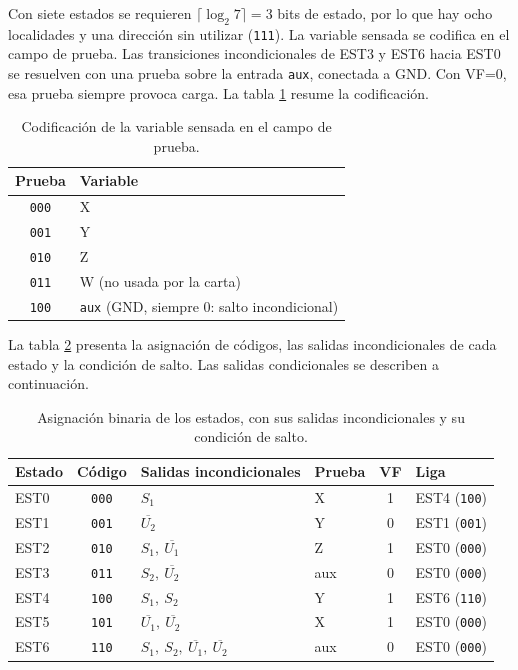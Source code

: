 Con siete estados se requieren $\lceil \log_2 7 \rceil = 3$ bits de estado, por lo que hay ocho
localidades y una dirección sin utilizar (\texttt{111}). La variable sensada se codifica en el
campo de prueba. Las transiciones incondicionales de EST3 y EST6 hacia EST0 se resuelven con una
prueba sobre la entrada \texttt{aux}, conectada a GND. Con VF=0, esa prueba siempre provoca carga.
La tabla \ref{tab:entradas} resume la codificación.

\begin{table}[H]
  \centering
  \caption{Codificación de la variable sensada en el campo de prueba.}
  \label{tab:entradas}
  \begin{tabular}{@{}c l@{}}
    \toprule
    \textbf{Prueba} & \textbf{Variable} \\
    \midrule
    \texttt{000} & X \\
    \texttt{001} & Y \\
    \texttt{010} & Z \\
    \texttt{011} & W (no usada por la carta) \\
    \texttt{100} & \texttt{aux} (GND, siempre 0: salto incondicional) \\
    \bottomrule
  \end{tabular}
\end{table}

La tabla \ref{tab:estados} presenta la asignación de códigos, las salidas incondicionales de cada
estado y la condición de salto. Las salidas condicionales se describen a continuación.

\begin{table}[H]
  \centering
  \caption{Asignación binaria de los estados, con sus salidas incondicionales y su condición de salto.}
  \label{tab:estados}
  \small
  \begin{tabular}{@{}l c l l c l@{}}
    \toprule
    \textbf{Estado} & \textbf{Código} & \textbf{Salidas incondicionales} & \textbf{Prueba} & \textbf{VF} & \textbf{Liga} \\
    \midrule
    EST0 & \texttt{000} & $S_1$                                    & X   & 1 & EST4 (\texttt{100}) \\
    EST1 & \texttt{001} & $\overline{U_2}$                         & Y   & 0 & EST1 (\texttt{001}) \\
    EST2 & \texttt{010} & $S_1,\ \overline{U_1}$                   & Z   & 1 & EST0 (\texttt{000}) \\
    EST3 & \texttt{011} & $S_2,\ \overline{U_2}$                   & aux & 0 & EST0 (\texttt{000}) \\
    EST4 & \texttt{100} & $S_1,\ S_2$                              & Y   & 1 & EST6 (\texttt{110}) \\
    EST5 & \texttt{101} & $\overline{U_1},\ \overline{U_2}$        & X   & 1 & EST0 (\texttt{000}) \\
    EST6 & \texttt{110} & $S_1,\ S_2,\ \overline{U_1},\ \overline{U_2}$ & aux & 0 & EST0 (\texttt{000}) \\
    \bottomrule
  \end{tabular}
\end{table}

